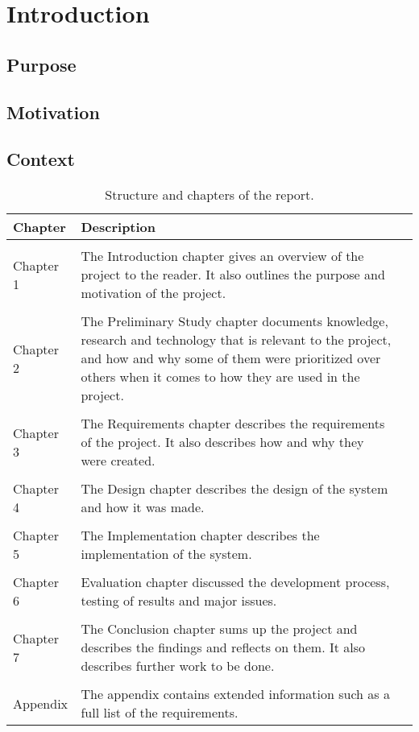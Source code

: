 
\chapter{Introduction}
\minitoc
\setcounter{page}{1}

\clearpage


\section{Purpose}

\section{Motivation}


\section{Context}
\begin{table}
\centering
\begin{tabularx}{\textwidth}{ l X l }
  \textbf{Chapter}      & \textbf{Description} \\
  \hline \\ [-1.5ex]
  Chapter 1 & The Introduction chapter gives an overview of the project to the reader. It also outlines the purpose and motivation of the project. \\
  \hline \\ [-1.5ex]
  Chapter 2 & The Preliminary Study chapter documents knowledge, research and technology that is relevant to the project, and how and why some of them were prioritized over others when it comes to how they are used in the project. \\
  \hline \\ [-1.5ex]
  Chapter 3 & The Requirements chapter describes the requirements of the project. It also describes how and why they were created. \\
  \hline \\ [-1.5ex]
  Chapter 4 & The Design chapter describes the design of the system and how it was made. \\
  \hline \\ [-1.5ex]
  Chapter 5 & The Implementation chapter describes the implementation of the system. \\
  \hline \\ [-1.5ex]
  Chapter 6 & Evaluation chapter discussed the development process, testing of results and major issues. \\
  \hline \\ [-1.5ex]
  Chapter 7 & The Conclusion chapter sums up the project and describes the findings and reflects on them. It also describes further work to be done. \\
  \hline \\ [-1.5ex]
  Appendix & The appendix contains extended information such as a full list of the requirements. \\
\end{tabularx}
\caption{Structure and chapters of the report.}
\label{table-reportstructure}
\end{table}
